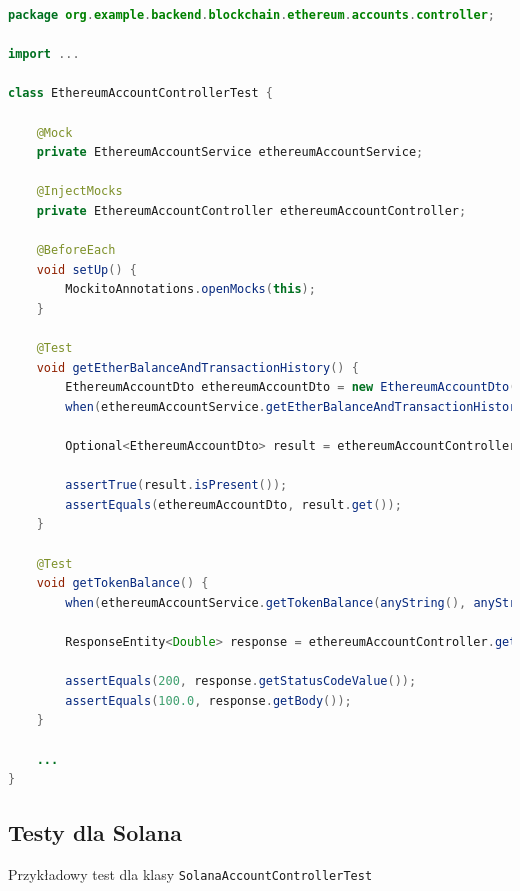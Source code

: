 \begin{lstlisting}[language=Java, style=JavaStyle]
package org.example.backend.blockchain.ethereum.accounts.controller;

import ...

class EthereumAccountControllerTest {

    @Mock
    private EthereumAccountService ethereumAccountService;

    @InjectMocks
    private EthereumAccountController ethereumAccountController;

    @BeforeEach
    void setUp() {
        MockitoAnnotations.openMocks(this);
    }

    @Test
    void getEtherBalanceAndTransactionHistory() {
        EthereumAccountDto ethereumAccountDto = new EthereumAccountDto();
        when(ethereumAccountService.getEtherBalanceAndTransactionHistory(anyString())).thenReturn(Optional.of(ethereumAccountDto));

        Optional<EthereumAccountDto> result = ethereumAccountController.GetEtherBalanceAndTransactionHistory("testAddress");

        assertTrue(result.isPresent());
        assertEquals(ethereumAccountDto, result.get());
    }

    @Test
    void getTokenBalance() {
        when(ethereumAccountService.getTokenBalance(anyString(), anyString())).thenReturn(100.0);

        ResponseEntity<Double> response = ethereumAccountController.getTokenBalance("testAddress", "testContractAddress");

        assertEquals(200, response.getStatusCodeValue());
        assertEquals(100.0, response.getBody());
    }

    ...
}
\end{lstlisting}

\subsection{Testy dla Solana}

Przykładowy test dla klasy \texttt{SolanaAccountControllerTest}

